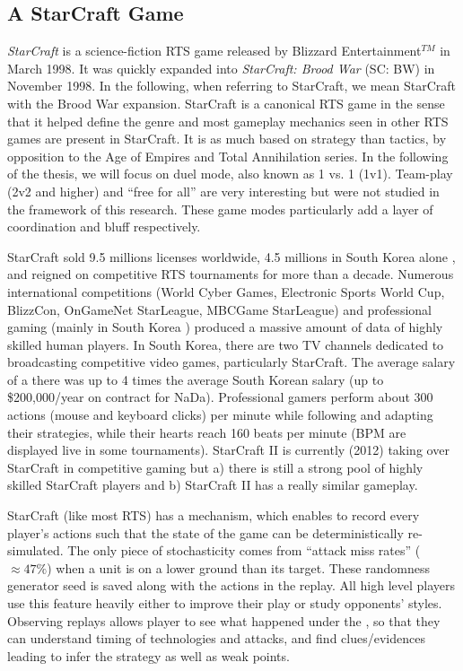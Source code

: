 \subsection{A StarCraft Game}
\textit{StarCraft} is a science-fiction RTS game released by Blizzard Entertainment$^{TM}$ in March 1998. It was quickly expanded into \textit{StarCraft: Brood War} (SC: BW) in November 1998. In the following, when referring to StarCraft, we mean StarCraft with the Brood War expansion. StarCraft is a canonical RTS game in the sense that it helped define the genre and most gameplay mechanics seen in other RTS games are present in StarCraft. It is as much based on strategy than tactics, by opposition to the Age of Empires and Total Annihilation series. In the following of the thesis, we will focus on duel mode, also known as 1 vs. 1 (1v1). Team-play (2v2 and higher) and ``free for all'' are very interesting but were not studied in the framework of this research. These game modes particularly add a layer of coordination and bluff respectively.


StarCraft sold 9.5 millions licenses worldwide, 4.5 millions in South Korea alone \citep{StarCraftNumbers}, and reigned on competitive RTS tournaments for more than a decade. Numerous international competitions (World Cyber Games, Electronic Sports World Cup, BlizzCon, OnGameNet StarLeague, MBCGame StarLeague) and professional gaming (mainly in South Korea \citep{Chee05}) produced a massive amount of data of highly skilled human players. In South Korea, there are two TV channels dedicated to broadcasting competitive video games, particularly StarCraft. The average salary of a  there was up to 4 times the average South Korean salary \citep{MYMPGM} (up to \$200,000/year on contract for NaDa). Professional gamers perform about 300 actions (mouse and keyboard clicks) per minute while following and adapting their strategies, while their hearts reach 160 beats per minute (BPM are displayed live in some tournaments). StarCraft II is currently (2012) taking over StarCraft in competitive gaming but a) there is still a strong pool of highly skilled StarCraft players and b) StarCraft II has a really similar gameplay.


StarCraft (like most RTS) has a \textit{} mechanism, which enables to record every player's actions such that the state of the game can be deterministically re-simulated. The only piece of stochasticity comes from ``attack miss rates'' ($\approx 47\%$) when a unit is on a lower ground than its target. These randomness generator seed is saved along with the actions in the replay. All high level players use this feature heavily either to improve their play or study opponents' styles. Observing replays allows player to see what happened under the \textit{}, so that they can understand timing of technologies and attacks, and find clues/evidences leading to infer the strategy as well as weak points.


